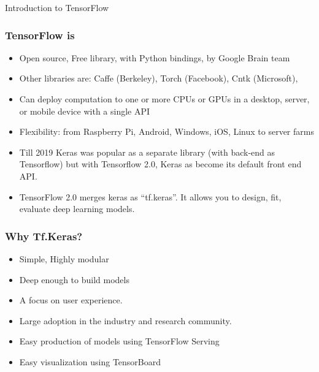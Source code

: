 \begin{frame}
  \begin{center}
    {\Large Introduction to TensorFlow}
  \end{center}
\end{frame}


\begin{frame}[fragile] \frametitle{TensorFlow is}
\begin{itemize}
\item Open source, Free library, with Python bindings, by Google Brain team
\item Other libraries are: Caffe (Berkeley), Torch (Facebook), Cntk (Microsoft),
\item Can deploy computation to one or more CPUs or GPUs in a desktop, server, or mobile device with a single API
\item Flexibility: from Raspberry Pi, Android, Windows, iOS, Linux to server farms
\item Till 2019 Keras was popular as a separate library  (with back-end as Tensorflow) but with Tensorflow 2.0, Keras as become its default front end API.
\item TensorFlow 2.0 merges keras as ``tf.keras''. It allows you to design, fit, evaluate deep learning models.
\end{itemize}
\end{frame}

\begin{frame}[fragile] \frametitle{Why Tf.Keras?}

\begin{itemize}
\item  Simple, Highly modular 
\item  Deep enough to build models
\item  A focus on user experience.
\item  Large adoption in the industry and research community.
\item  Easy production of models using TensorFlow Serving
\item Easy visualization using TensorBoard
\end{itemize}
\end{frame}


